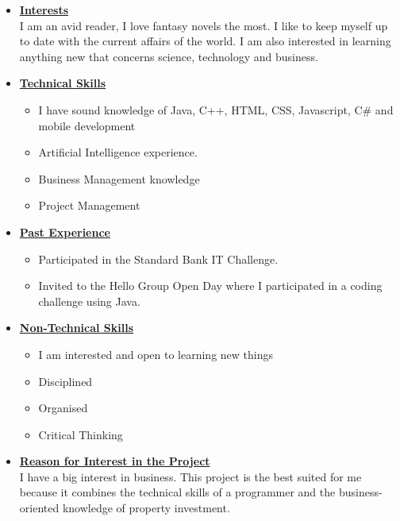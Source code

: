 \documentclass[a4paper,12pt]{article}
\begin{document}
\begin{itemize}
\item {\large \underline{\textbf{Interests}}}\\[0.2cm]
I am an avid reader, I love fantasy novels the most. I like to keep myself up to date with the current affairs of the world. I am also interested in learning anything new that concerns science, technology and business.
\\
\item {\large \underline{\textbf{Technical Skills}}}
	\begin{itemize}
		\item I have sound knowledge of Java, C++, HTML, CSS, Javascript, C\# and mobile development 
		\item Artificial Intelligence experience.
		\item Business Management knowledge
		\item Project Management
	\end{itemize}
\bigskip
\item {\large \underline{\textbf{Past Experience}}}
\begin{itemize}
\item Participated in the Standard Bank IT Challenge.
\item Invited to the Hello Group Open Day where I participated in a coding challenge using Java.
\end{itemize}
\bigskip
\item {\large \underline{\textbf{Non-Technical Skills}}}
\begin{itemize}
\item I am interested and open to learning new things
\item Disciplined
\item Organised
\item Critical Thinking
\end{itemize}
\bigskip
\item {\large \underline{\textbf{Reason for Interest in the Project}}}\\[0.2cm]
I have a big interest in business. This project is the best suited for me because it combines the technical skills of a programmer and the business-oriented knowledge of property investment.

\newpage
\end{itemize}
\end{document}
